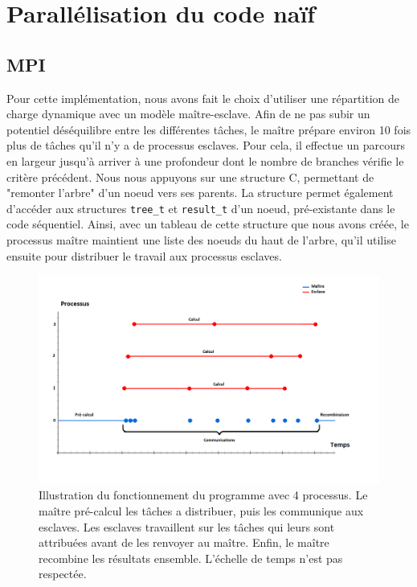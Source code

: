 \documentclass[12pt]{article}
\begin{document}
\section{Parallélisation du code naïf}
    \subsection{MPI}
    Pour cette implémentation, nous avons fait le choix d'utiliser une 
    répartition de charge dynamique avec un modèle maître-esclave.
    Afin de ne pas subir un potentiel déséquilibre entre les différentes
    tâches, le maître prépare environ 10 fois plus de tâches qu'il n'y a
    de processus esclaves. Pour cela, il effectue un parcours en largeur
    jusqu'à arriver à une profondeur dont le nombre de branches vérifie le
    critère précédent. Nous nous appuyons sur une structure C, permettant de
    "remonter l'arbre" d'un noeud vers ses parents. La structure permet
    également d'accéder aux structures \texttt{tree\_t} et \texttt{result\_t}
    d'un noeud, pré-existante dans le code séquentiel.
    Ainsi, avec un tableau de cette structure que nous avons créée, le 
    processus maître maintient une liste des noeuds du haut de l'arbre,
    qu'il utilise ensuite pour distribuer le travail aux processus esclaves.\\
    \begin{figure}[t] \begin{center}
        \includegraphics[scale=0.33]{figures/time}
        \caption{\label{fig:time}Illustration du fonctionnement du programme
        avec 4 processus. Le maître pré-calcul les tâches a distribuer,
        puis les communique aux esclaves. Les esclaves travaillent sur les
        tâches qui leurs sont attribuées avant de les renvoyer au maître.
        Enfin, le maître recombine les résultats ensemble. L'échelle de temps 
        n'est pas respectée.}
    \end{center} \end{figure}
\end{document}
